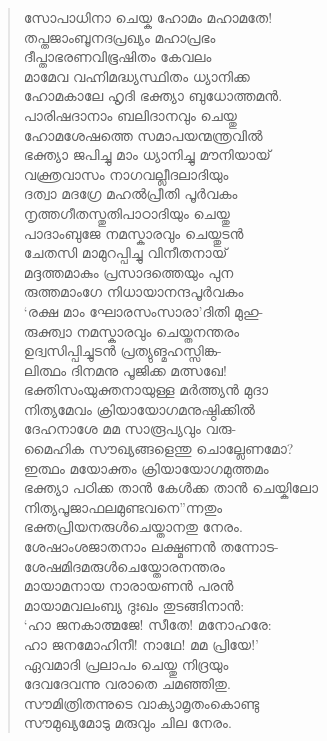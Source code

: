 \begin{verse}
സോപാധിനാ ചെയ്ക ഹോമം മഹാമതേ!\\
തപ്തജാംബൂനദപ്രഖ്യം മഹാപ്രഭം\\
ദീപ്താഭരണവിഭൂഷിതം കേവലം\\
മാമേവ വഹ്നിമദ്ധ്യസ്ഥിതം ധ്യാനിക്ക\\
ഹോമകാലേ ഹൃദി ഭക്ത്യാ ബുധോത്തമന്‍.\\
പാരിഷദാനാം ബലിദാനവും ചെയ്തു\\
ഹോമശേഷത്തെ സമാപയന്മന്ത്രവില്‍\\
ഭക്ത്യാ ജപിച്ചു മാം ധ്യാനിച്ചു മൗനിയായ്\\
വക്ത്രവാസം നാഗവല്ലീദലാദിയും\\
ദത്വാ മദഗ്രേ മഹല്‍പ്രീതി പൂര്‍വകം\\
നൃത്തഗീതസ്തുതിപാഠാദിയും ചെയ്തു\\
പാദാംബുജേ നമസ്കാരവും ചെയ്തുടന്‍\\
ചേതസി മാമുറപ്പിച്ചു വിനീതനായ്\\
മദ്ദത്തമാകും പ്രസാദത്തെയും പുന\\
രുത്തമാംഗേ നിധായാനന്ദപൂര്‍വകം\\
‘രക്ഷ മാം ഘോരസംസാരാ’ദിതി മുഹു-\\
രുക്ത്വാ നമസ്കാരവും ചെയ്തനന്തരം\\
ഉദ്വസിപ്പിച്ചുടന്‍ പ്രത്യുങ്മഹസ്സിങ്ക-\\
ലിത്ഥം ദിനമനു പൂജിക്ക മത്സഖേ!\\
ഭക്തിസംയുക്തനായുള്ള മര്‍ത്ത്യന്‍ മുദാ\\
നിത്യമേവം ക്രിയായോഗമനുഷ്ഠിക്കില്‍\\
ദേഹനാശേ മമ സാരൂപ്യവും വരു-\\
മൈഹിക സൗഖ്യങ്ങളെന്തു ചൊല്ലേണമോ?\\
ഇത്ഥം മയോക്തം ക്രിയായോഗമുത്തമം\\
ഭക്ത്യാ പഠിക്ക താന്‍ കേള്‍ക്ക താന്‍ ചെയ്കിലോ\\
നിത്യപൂജാഫലമുണ്ടവനെ”ന്നതും\\
ഭക്തപ്രിയനരുള്‍ചെയ്താനതു നേരം.\\
ശേഷാംശജാതനാം ലക്ഷ്മണന്‍ തന്നോട-\\
ശേഷമിദമരുള്‍ചെയ്തോരനന്തരം\\
മായാമനായ നാരായണന്‍ പരന്‍\\
മായാമവലംബ്യ ദുഃഖം തുടങ്ങിനാന്‍:\\
‘ഹാ ജനകാത്മജേ! സീതേ! മനോഹരേ:\\
ഹാ ജനമോഹിനീ! നാഥേ! മമ പ്രിയേ!’\\
ഏവമാദി പ്രലാപം ചെയ്തു നിദ്രയും\\
ദേവദേവന്നു വരാതെ ചമഞ്ഞിതു.\\
സൗമിത്രിതന്നുടെ വാക്യാമൃതംകൊണ്ടു\\
സൗമുഖ്യമോടു മരുവും ചില നേരം.
\end{verse}

